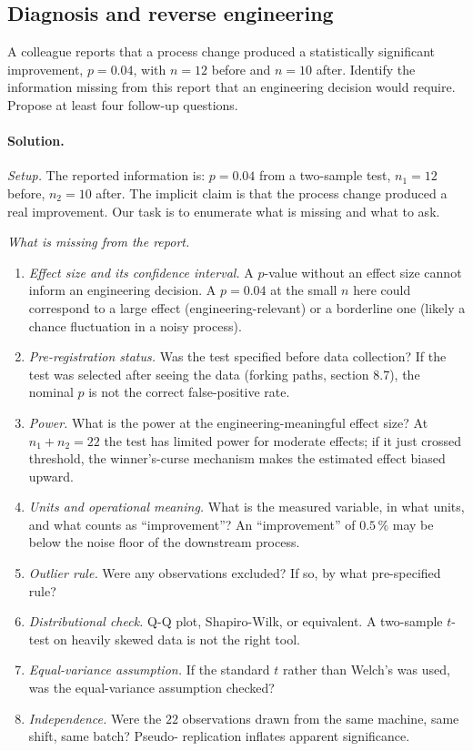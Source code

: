\subsection*{Diagnosis and reverse engineering}

\begin{exercise}
A colleague reports that a process change produced a statistically
significant improvement, $p = 0.04$, with $n = 12$ before and
$n = 10$ after. Identify the information missing from this
report that an engineering decision would require. Propose at
least four follow-up questions.
\end{exercise}

\paragraph{Solution.}
\textit{Setup.} The reported information is: $p = 0.04$ from a
two-sample test, $n_{1} = 12$ before, $n_{2} = 10$ after. The
implicit claim is that the process change produced a real
improvement. Our task is to enumerate what is missing and what to
ask.

\textit{What is missing from the report.}
\begin{enumerate}[leftmargin=*]
  \item \textit{Effect size and its confidence interval.} A
    $p$-value without an effect size cannot inform an engineering
    decision. A $p = 0.04$ at the small $n$ here could correspond
    to a large effect (engineering-relevant) or a borderline one
    (likely a chance fluctuation in a noisy process).
  \item \textit{Pre-registration status.} Was the test specified
    before data collection? If the test was selected after seeing
    the data (forking paths, section 8.7), the nominal $p$ is not
    the correct false-positive rate.
  \item \textit{Power.} What is the power at the
    engineering-meaningful effect size? At $n_{1} + n_{2} = 22$
    the test has limited power for moderate effects; if it just
    crossed threshold, the winner's-curse mechanism makes the
    estimated effect biased upward.
  \item \textit{Units and operational meaning.} What is the
    measured variable, in what units, and what counts as
    ``improvement''? An ``improvement'' of $0.5 \,\%$ may be below
    the noise floor of the downstream process.
  \item \textit{Outlier rule.} Were any observations excluded? If
    so, by what pre-specified rule?
  \item \textit{Distributional check.} Q-Q plot, Shapiro-Wilk, or
    equivalent. A two-sample $t$-test on heavily skewed data is
    not the right tool.
  \item \textit{Equal-variance assumption.} If the standard $t$
    rather than Welch's was used, was the equal-variance
    assumption checked?
  \item \textit{Independence.} Were the $22$ observations drawn
    from the same machine, same shift, same batch? Pseudo-
    replication inflates apparent significance.
\end{enumerate}

